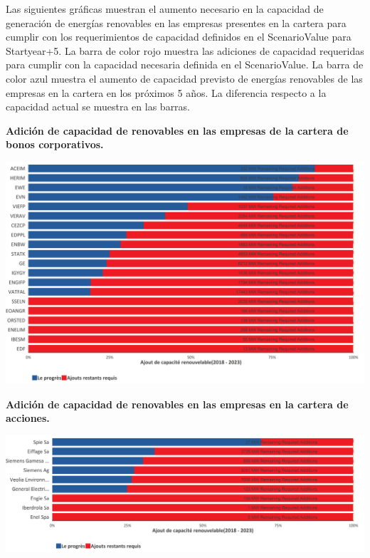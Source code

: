 \documentclass[10pt,table]{article}\usepackage[]{graphicx}\usepackage[]{color}
\begin{document}
Las siguientes gráficas muestran el aumento necesario en la capacidad de generación de energías renovables en las empresas presentes en la cartera para cumplir con los requerimientos de capacidad definidos en el ScenarioValue para Startyear+5. La barra de color rojo muestra las adiciones de capacidad requeridas para cumplir con la capacidad necesaria definida en el ScenarioValue. La barra de color azul muestra el aumento de capacidad previsto de energías renovables de las empresas en la cartera en los próximos 5 años. La diferencia respecto a la capacidad actual se muestra en las barras.

	
	\textbf{Adición de capacidad de renovables en las empresas de la cartera de bonos corporativos.}
	\vspace{-.0cm}
	
	\begin{center}
		\includegraphics[trim = {0 0cm 0 0},width=1\linewidth]{ReportOutputs/Fig64}
	\end{center}
	
	\textbf{Adición de capacidad de renovables en las empresas en la cartera de acciones.}
	\vspace{-.0cm}
	
	\begin{center}
		\includegraphics[trim = {0 0cm 0 0},width=1\linewidth]{ReportOutputs/Fig65}
	\end{center}
	
\end{document}
